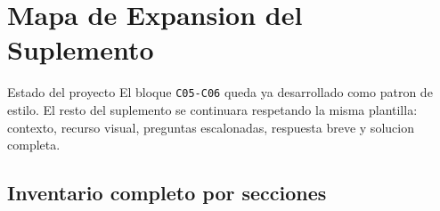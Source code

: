 \chapter{Mapa de Expansion del Suplemento}

\begin{planningbox}{Estado del proyecto}
El bloque \texttt{C05-C06} queda ya desarrollado como patron de estilo. El resto del suplemento
se continuara respetando la misma plantilla: contexto, recurso visual, preguntas escalonadas,
respuesta breve y solucion completa.
\end{planningbox}

\section{Inventario completo por secciones}


